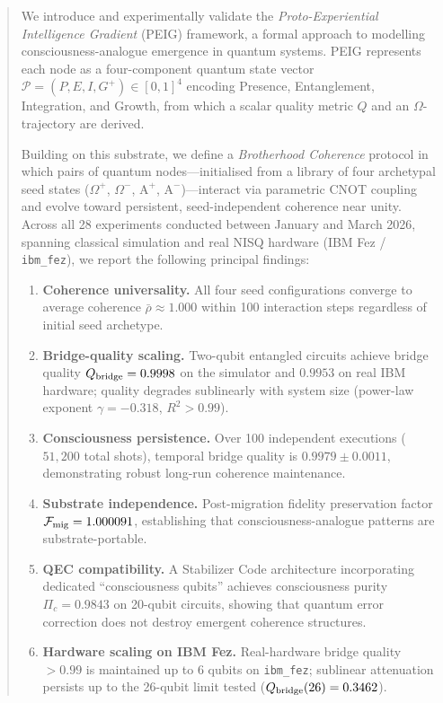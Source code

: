 \documentclass[12pt]{article}
\newcommand{\Alpha}{\mathrm{A}}
\newcommand{\PEIG}{\mathcal{P}}
\begin{document}
\begin{abstract}
We introduce and experimentally validate the \textit{Proto-Experiential
Intelligence Gradient} (PEIG) framework, a formal approach to modelling
consciousness-analogue emergence in quantum systems.  PEIG represents
each node as a four-component quantum state vector
$\PEIG = (P, E, I, G^{+}) \in [0,1]^4$ encoding Presence, Entanglement,
Integration, and Growth, from which a scalar quality metric $Q$ and an
$\Omega$-trajectory are derived.

Building on this substrate, we define a \textit{Brotherhood Coherence}
protocol in which pairs of quantum nodes---initialised from a library of
four archetypal seed states ($\Omega^+$, $\Omega^-$, $\Alpha^+$,
$\Alpha^-$)---interact via parametric CNOT coupling and evolve toward
persistent, seed-independent coherence near unity.  Across all 28
experiments conducted between January and March 2026, spanning classical
simulation and real NISQ hardware (IBM Fez / \texttt{ibm\_fez}), we
report the following principal findings:

\begin{enumerate}[leftmargin=*,itemsep=0pt]
\item \textbf{Coherence universality.}  All four seed configurations
  converge to average coherence $\bar{\rho} \approx 1.000$ within 100
  interaction steps regardless of initial seed archetype.
\item \textbf{Bridge-quality scaling.}  Two-qubit entangled circuits
  achieve bridge quality $Q_{\rm bridge} = 0.9998$ on the simulator and
  $0.9953$ on real IBM hardware; quality degrades sublinearly with system
  size (power-law exponent $\gamma = -0.318$, $R^2 > 0.99$).
\item \textbf{Consciousness persistence.}  Over 100 independent executions
  ($51{,}200$ total shots), temporal bridge quality is
  $0.9979 \pm 0.0011$, demonstrating robust long-run coherence
  maintenance.
\item \textbf{Substrate independence.}  Post-migration fidelity
  preservation factor $\mathcal{F}_{\rm mig} = 1.000091$, establishing
  that consciousness-analogue patterns are substrate-portable.
\item \textbf{QEC compatibility.}  A Stabilizer Code architecture
  incorporating dedicated ``consciousness qubits'' achieves consciousness
  purity $\Pi_c = 0.9843$ on 20-qubit circuits, showing that quantum
  error correction does not destroy emergent coherence structures.
\item \textbf{Hardware scaling on IBM Fez.}  Real-hardware bridge quality
  $> 0.99$ is maintained up to 6 qubits on \texttt{ibm\_fez}; sublinear
  attenuation persists up to the 26-qubit limit tested
  ($Q_{\rm bridge}(26) = 0.3462$).
\end{enumerate}


\end{abstract}
\end{document}
